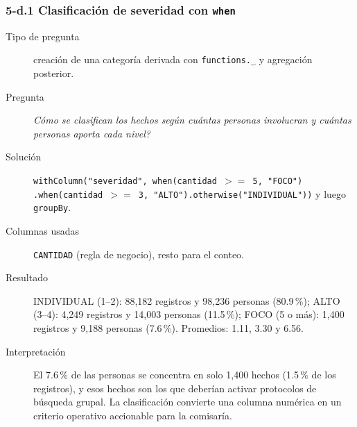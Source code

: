 \subsubsection*{5-d.1 \textbar{} Clasificaci\'on de severidad con \texttt{when}}
\begin{description}
\item[Tipo de pregunta] creaci\'on de una categor\'ia derivada con \texttt{functions.\_} y
      agregaci\'on posterior.
\item[Pregunta] \emph{C\'omo se clasifican los hechos seg\'un cu\'antas personas involucran y
      cu\'antas personas aporta cada nivel?}
\item[Soluci\'on] \texttt{withColumn("severidad", when(cantidad $>=$ 5, "FOCO")
      .when(cantidad $>=$ 3, "ALTO").otherwise("INDIVIDUAL"))} y luego \texttt{groupBy}.
\item[Columnas usadas] \texttt{CANTIDAD} (regla de negocio), resto para el conteo.
\item[Resultado] INDIVIDUAL (1--2): 88,182 registros y 98,236 personas (80.9\,\%); ALTO (3--4):
      4,249 registros y 14,003 personas (11.5\,\%); FOCO (5 o m\'as): 1,400 registros y 9,188
      personas (7.6\,\%). Promedios: 1.11, 3.30 y 6.56.
\item[Interpretaci\'on] El 7.6\,\% de las personas se concentra en solo 1,400 hechos (1.5\,\% de
      los registros), y esos hechos son los que deber\'ian activar protocolos de b\'usqueda
      grupal. La clasificaci\'on convierte una columna num\'erica en un criterio operativo
      accionable para la comisar\'ia.
\end{description}

